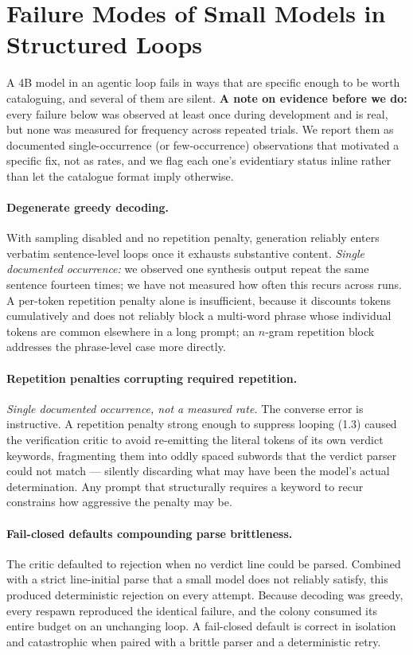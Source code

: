 \documentclass[11pt]{article}
\begin{document}
\section{Failure Modes of Small Models in Structured Loops}
\label{sec:failures}

A 4B model in an agentic loop fails in ways that are specific enough to be
worth cataloguing, and several of them are silent. \textbf{A note on evidence
before we do:} every failure below was observed at least once during
development and is real, but none was measured for frequency across repeated
trials. We report them as documented single-occurrence (or few-occurrence)
observations that motivated a specific fix, not as rates, and we flag each
one's evidentiary status inline rather than let the catalogue format imply
otherwise.

\paragraph{Degenerate greedy decoding.} With sampling disabled and no
repetition penalty, generation reliably enters verbatim sentence-level loops
once it exhausts substantive content. \emph{Single documented occurrence:} we
observed one synthesis output repeat the same sentence fourteen times; we have
not measured how often this recurs across runs. A per-token repetition penalty alone is
insufficient, because it discounts tokens cumulatively and does not reliably
block a multi-word phrase whose individual tokens are common elsewhere in a
long prompt; an $n$-gram repetition block addresses the phrase-level case more
directly.

\paragraph{Repetition penalties corrupting required repetition.} \emph{Single
documented occurrence, not a measured rate.} The converse
error is instructive. A repetition penalty strong enough to suppress looping
(1.3) caused the verification critic to avoid re-emitting the literal tokens
of its own verdict keywords, fragmenting them into oddly spaced subwords that
the verdict parser could not match --- silently discarding what may have been
the model's actual determination. Any prompt that structurally requires a
keyword to recur constrains how aggressive the penalty may be.

\paragraph{Fail-closed defaults compounding parse brittleness.} The critic
defaulted to rejection when no verdict line could be parsed. Combined with a
strict line-initial parse that a small model does not reliably satisfy, this
produced deterministic rejection on every attempt. Because decoding was greedy,
every respawn reproduced the identical failure, and the colony consumed its
entire budget on an unchanging loop. A fail-closed default is correct in
isolation and catastrophic when paired with a brittle parser and a
deterministic retry.
\end{document}

